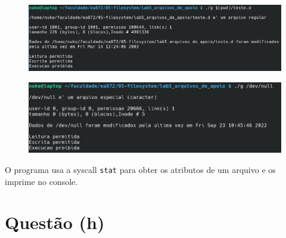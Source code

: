 \documentclass{article}
\begin{document}
\begin{figure}[!ht]
    \begin{center}
        \includegraphics[width=\textwidth]{images/questao_g2.png}
    \end{center}
\end{figure} 

\begin{figure}[!ht]
    \begin{center}
        \includegraphics[width=\textwidth]{images/questao_g3.png}
    \end{center}
\end{figure} 
\FloatBarrier

O programa usa a syscall \texttt{stat} para obter os atributos de um arquivo e os imprime no console.

\section*{Questão (h)}
\end{document}
